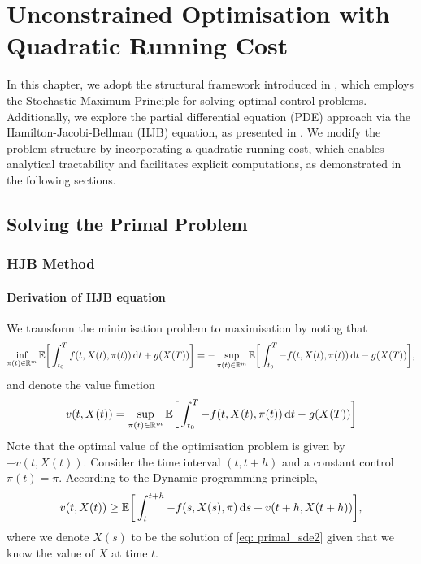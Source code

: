 \chapter{Unconstrained Optimisation with Quadratic Running Cost}
\label{sec:unconstrained}

In this chapter, we adopt the structural framework introduced in \cite{Duality_Method_for_Multidimensional_Nonsmooth_Constrained_Linear_Convex_Stochastic_Control}, which employs the Stochastic Maximum Principle for solving optimal control problems. Additionally, we explore the partial differential equation (PDE) approach via the Hamilton-Jacobi-Bellman (HJB) equation, as presented in \cite{Pham}. We modify the problem structure by incorporating a quadratic running cost, which enables analytical tractability and facilitates explicit computations, as demonstrated in the following sections.

\section{Solving the Primal Problem}

\subsection{HJB Method}

\subsubsection{Derivation of HJB equation}\label{Derivation of HJB equation}
We transform the minimisation problem to maximisation by noting that
\begin{equation*}
     \inf_{\pi(t) \in \mathbb{R}^m} \mathbb{E} \bigg[ \int_{t_0}^T f(t, X(t), \pi(t)) \mathop{}\!\mathrm{d} t + g(X(T))\bigg] = - \sup_{\pi(t) \in \mathbb{R}^m} \mathbb{E} \bigg[ \int_{t_0}^T - f(t, X(t), \pi(t)) \mathop{}\!\mathrm{d} t - g(X(T))\bigg],
\end{equation*}
and denote the value function 
\begin{equation}
    v(t, X(t)) = \sup_{\pi(t) \in \mathbb{R}^m} \mathbb{E} \bigg[ \int_{t_0}^T - f(t, X(t), \pi(t)) \mathop{}\!\mathrm{d} t - g(X(T))\bigg]
\end{equation}
Note that the optimal value of the optimisation problem is given by $-v(t,X(t))$. Consider the time interval $(t, t + h)$ and a constant control $\pi(t) = \pi$. According to the Dynamic programming principle,
\begin{equation}
    v(t, X(t)) \ge \mathbb{E} \bigg[ \int_{t}^{t+h} - f(s, X(s), \pi) \mathop{}\!\mathrm{d} s + v(t+h, X(t + h)) \bigg],
    \label{eq: 1}
\end{equation}
where we denote $X(s)$ to be the solution of \eqref{eq: primal_sde2} given that we know the value of $X$ at time $t$.\\

